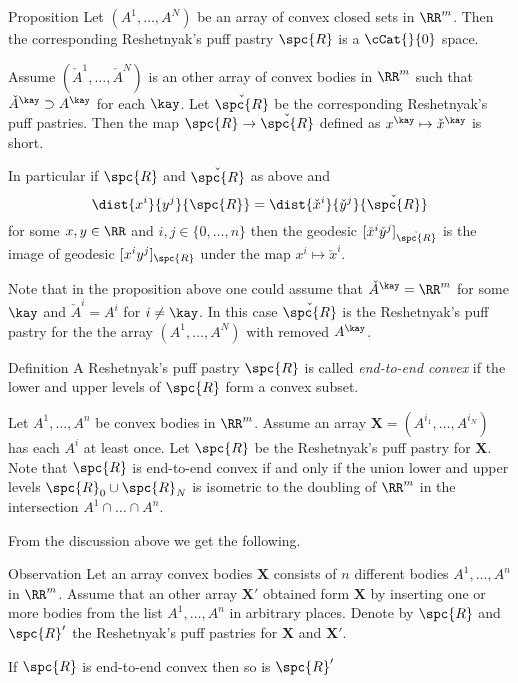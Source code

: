 \begin{thm}{Proposition}
Let $(A^1,\dots,A^N)$ be an array of convex closed sets in $\RR^m$.
Then the corresponding Reshetnyak's puff pastry $\spc{R}$
is a $\cCat{}{0}$ space.

Assume $(\check A^1,\dots,\check A^N)$ is an other array of convex bodies in $\RR^m$ such that $\check A^\kay\supset A^\kay$ for each $\kay$.
Let $\check{\spc{R}}$ be the corresponding Reshetnyak's  puff pastries.
Then the map $\spc{R}\to\check{\spc{R}}$
defined as $x^\kay\mapsto\check x^\kay$ is short.

In particular 
if  $\spc{R}$ and $\check{\spc{R}}$ as above and
\[\dist{x^i}{y^j}{\spc{R}}=\dist{\check x^i}{\check y^j}{\check{\spc{R}}}\]
for some $x,y\in \RR$ and $i,j\in \{0,\dots,n\}$
then the geodesic $[\check x^i \check y^j]_{\check{\spc{R}}}$ 
is the image of geodesic $[x^i y^j]_{\spc{R}}$
under the map $x^i\mapsto \check x^i$.
\end{thm}

Note that in the proposition above one could assume that $\check A^\kay=\RR^m$ for some $\kay$
and $\check A^i=A^i$ for $i\ne \kay$.
In this case $\check{\spc{R}}$ 
is the Reshetnyak's  puff pastry for the 
the array $(A^1,\dots,A^N)$ with removed $A^\kay$. 

\begin{thm}{Definition}
A Reshetnyak's puff pastry $\spc{R}$ 
is called \emph{end-to-end convex} 
if the lower and upper levels of $\spc{R}$ form a convex subset.
\end{thm}

Let $A^1,\dots,A^n$ be convex bodies in $\RR^m$.
Assume an array $\bm{X}=(A^{i_1},\dots, A^{i_N})$
has each $A^i$ at least once. 
Let $\spc{R}$ be the Reshetnyak's puff pastry for $\bm{X}$.
Note that $\spc{R}$ is end-to-end convex
if and only if the union lower and upper levels
$\spc{R}_0\cup\spc{R}_N$ is isometric to the doubling of $\RR^m$ in the intersection $A^1\cap\dots\cap A^n$.

From the discussion above we get the following.

\begin{thm}{Observation}
Let an array convex bodies $\bm{X}$
consists of $n$ different bodies $A^1,\dots,A^n$
in $\RR^m$.
Assume that an other array $\bm{X}'$
obtained form $\bm{X}$ by inserting one or more bodies from the list $A^1,\dots,A^n$ in arbitrary places.
Denote by $\spc{R}$ and $\spc{R}'$ 
the Reshetnyak's puff pastries for $\bm{X}$ and $\bm{X}'$.

If $\spc{R}$ is end-to-end convex then so is $\spc{R}'$
\end{thm}



